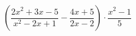 \begin{ex}[type=expression]
	\begin{condition}
		\( \left( \dfrac{2x^2+3x-5}{x^2-2x+1}-\dfrac{4x+5}{2x-2} \right)\cdot\dfrac{x^2-1}{5} \)
	\end{condition}
\end{ex}